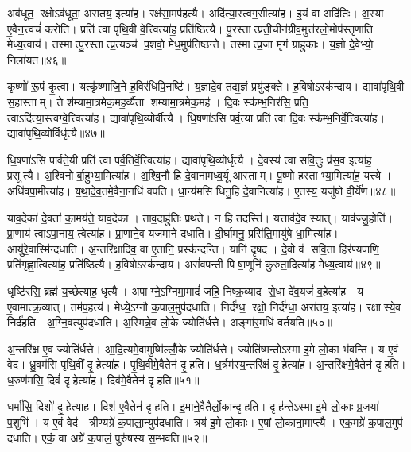 अव॑धूत॒ रक्षोऽव॑धूता॒ अरा॑तय॒ इत्या॑ह।
रक्ष॑सा॒मप॑हत्यै।
अदि॑त्या॒स्त्वग॒सीत्या॑ह।
इ॒यं वा अदि॑तिः।
अ॒स्या ए॒वैन॒त्त्वचं॑ करोति।
प्रति॑ त्वा पृथि॒वी वे॒त्त्वित्या॑ह॒ प्रति॑ष्ठित्यै।
पु॒रस्तात्प्रती॒चीन॑ग्रीव॒मुत्त॑रलो॒मोप॑स्तृणाति मेध्य॒त्वाय॑।
तस्मात्पु॒रस्तात्प्र॒त्यञ्च॑ प॒शवो॒ मेध॒मुप॑तिष्ठन्ते।
तस्मात्प्र॒जा मृ॒गं ग्राहु॑काः।
य॒ज्ञो दे॒वेभ्यो॒ निला॑यत॥४६॥

कृष्णो॑ रू॒पं कृ॒त्वा।
यत्कृ॑ष्णाजि॒ने ह॒विर॑धिपि॒नष्टि॑।
य॒ज्ञादे॒व तद्य॒ज्ञं प्रयु॑ङ्क्ते।
ह॒विषोऽस्क॑न्दाय।
द्यावा॑पृथि॒वी स॒हास्ताम्।
ते श॑म्यामा॒त्रमेक॒मह॒र्व्यैता शम्यामा॒त्रमेक॒मह॑।
दि॒वः स्क॑म्भ॒निर॑सि॒ प्रति॒ त्वाऽदि॑त्या॒स्त्वग्वे॒त्त्वित्या॑ह।
द्यावा॑पृथि॒व्योर्वीत्यै।
धि॒षणा॑ऽसि पर्व॒त्या प्रति॑ त्वा दि॒वः स्क॑म्भ॒निर्वे॒त्त्वित्या॑ह।
द्यावा॑पृथि॒व्योर्विधृ॑त्यै॥४७॥

धि॒षणा॑ऽसि पार्वते॒यी प्रति॑ त्वा पर्व॒तिर्वे॒त्त्वित्या॑ह।
द्यावा॑पृथि॒व्योर्धृत्यै।
दे॒वस्य॑ त्वा सवि॒तुः प्र॑स॒व इत्या॑ह॒ प्रसूत्यै।
अ॒श्विनोर्बा॒हुभ्या॒मित्या॑ह।
अ॒श्वि॒नौ हि दे॒वाना॑मध्व॒र्यू आस्ताम्।
पू॒ष्णो हस्ताभ्या॒मित्या॑ह॒ यत्त्ये।
अधि॑वपा॒मीत्या॑ह।
य॒था॒दे॒व॒तमे॒वैना॒नधि॑ वपति।
धा॒न्य॑मसि धिनु॒हि दे॒वानित्या॑ह।
ए॒तस्य॒ यजु॑षो वी॒र्ये॑ण॥४८॥

याव॒देका॑ दे॒वता॑ का॒मय॑ते॒ याव॒देका।
ताव॒दाहु॑तिः प्रथते।
न हि तदस्ति॑।
यत्ताव॑दे॒व स्यात्।
याव॑ज्जु॒होति॑।
प्रा॒णाय॑ त्वाऽपा॒नाय॒ त्वेत्या॑ह।
प्रा॒णाने॒व यज॑माने दधाति।
दी॒र्घामनु॒ प्रसि॑ति॒मायु॑षे धा॒मित्या॑ह।
आयु॑रे॒वास्मि॑न्दधाति।
अ॒न्तरि॑क्षादिव॒ वा ए॒तानि॒ प्रस्क॑न्दन्ति।
यानि॑ दृ॒षद॑।
दे॒वो व॑ सवि॒ता हिर॑ण्यपाणि॒ प्रति॑गृह्णा॒त्वित्या॑ह॒ प्रति॑ष्ठित्यै।
ह॒विषोऽस्क॑न्दाय।
असं॑वपन्ती पिषा॒णूनि॑ कुरुता॒दित्या॑ह मेध्य॒त्वाय॑॥४९॥\anuvakamend[निला॑यत॒ विधृ॑त्यै वी॒र्ये॑ण स्कन्दन्ति च॒त्वारि॑ च]

धृष्टि॑रसि॒ ब्रह्म॑ य॒च्छेत्या॑ह॒ धृत्यै।
अपाग्ने॒ऽग्निमा॒मादं॑ जहि॒ निष्क्र॒व्याद से॒धा दे॑व॒यजं॑ व॒हेत्या॑ह।
य ए॒वामात्क्र॒व्यात्।
तम॑प॒हत्य॑।
मेध्ये॒ऽग्नौ क॒पाल॒मुप॑दधाति।
निर्द॑ग्ध॒ रक्षो॒ निर्द॑ग्धा॒ अरा॑तय॒ इत्या॑ह।
रक्षास्ये॒व निर्द॑हति।
अ॒ग्नि॒वत्युप॑दधाति।
अ॒स्मिन्ने॒व लो॒के ज्योति॑र्धत्ते।
अङ्गा॑र॒मधि॑ वर्तयति॥५०॥

अ॒न्तरि॑क्ष ए॒व ज्योति॑र्धत्ते।
आ॒दि॒त्यमे॒वामुष्मि॑ल्लोँ॒के ज्योति॑र्धत्ते।
ज्योति॑ष्मन्तोऽस्मा इ॒मे लो॒का भ॑वन्ति।
य ए॒वं वेद॑।
ध्रु॒वम॑सि पृथि॒वीं दृ॒हेत्या॑ह।
पृ॒थि॒वीमे॒वैतेन॑ दृ॒हति।
ध॒र्त्रम॑स्य॒न्तरि॑क्षं दृ॒हेत्या॑ह।
अ॒न्तरि॑क्षमे॒वैतेन॑ दृहति।
ध॒रुण॑मसि॒ दिवं॑ दृ॒हेत्या॑ह।
दिव॑मे॒वैतेन॑ दृहति॥५१॥

धर्मा॑सि॒ दिशो॑ दृ॒हेत्या॑ह।
दिश॑ ए॒वैतेन॑ दृहति।
इ॒माने॒वैतैर्लो॒कान्दृहति।
दृह॑न्तेऽस्मा इ॒मे लो॒काः प्र॒जया॑ प॒शुभि॑।
य ए॒वं वेद॑।
त्रीण्यग्रे॑ क॒पाला॒न्युप॑दधाति।
त्रय॑ इ॒मे लो॒काः।
ए॒षां लो॒काना॒माप्त्यै।
एक॒मग्रे॑ क॒पाल॒मुप॑ दधाति।
एकं॒ वा अग्रे॑ क॒पालं॒ पुरु॑षस्य स॒म्भव॑ति॥५२॥

